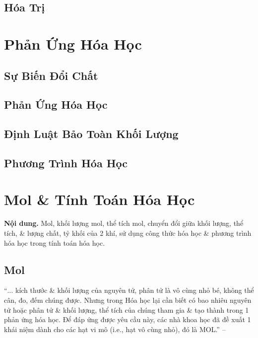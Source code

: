 \documentclass{article}
\numberwithin{equation}{section}
\begin{document}

\subsection{Hóa Trị}


\section{Phản Ứng Hóa Học}

\subsection{Sự Biến Đổi Chất}


\subsection{Phản Ứng Hóa Học}


\subsection{Định Luật Bảo Toàn Khối Lượng}


\subsection{Phương Trình Hóa Học}


\section{Mol \& Tính Toán Hóa Học}
\textsf{\textbf{Nội dung.} Mol, khối lượng mol, thể tích mol, chuyển đổi giữa khối lượng, thể tích, \& lượng chất, tỷ khối của 2 khí, sử dụng công thức hóa học \& phương trình hóa học trong tính toán hóa học.}

\subsection{Mol}
``$\ldots$ kích thước \& khối lượng của nguyên tử, phân tử là vô cùng nhỏ bé, không thể cân, đo, đếm chúng được. Nhưng trong Hóa học lại cần biết có bao nhiêu nguyên tử hoặc phân tử \& khối lượng, thể tích của chúng tham gia \& tạo thành trong 1 phản ứng hóa học. Để đáp ứng được yêu cầu này, các nhà khoa học đã đề xuất 1 khái niệm dành cho các hạt vi mô (i.e., hạt vô cùng nhỏ), đó là MOL.'' -- \cite[p. 63]{SGK_Hoa_Hoc_8}
\end{document}
